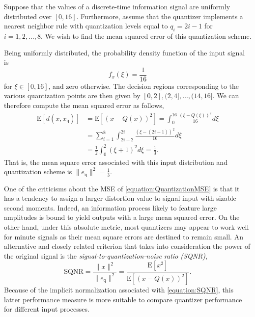 \begin{example} \label{example:UniformQuantizer}
Suppose that the values of a discrete-time information signal are uniformly distributed over $[0,16]$.
Furthermore, assume that the quantizer implements a nearest neighbor rule with quantization levels equal to $q_i = 2i - 1$ for $i = 1, 2, \ldots, 8$.
We wish to find the mean squared error of this quantization scheme.

Being uniformly distributed, the probability density function of the input signal is
\begin{equation*}
f_x (\xi) = \frac{1}{16}
\end{equation*}
for $\xi \in [0, 16]$, and zero otherwise.
The decision regions corresponding to the various quantization points are then given by $[0, 2], (2, 4], \ldots, (14, 16]$.
We can therefore compute the mean squared error as follows,
\begin{equation*}
\begin{split}
\mathrm{E} [ d(x, x_{\mathrm{q}}) ]
&= \mathrm{E} \left[ (x - Q(x))^2 \right]
= \int_0^{16} \frac{(\xi - Q(\xi))^2}{16} d\xi \\
&= \sum_{i=1}^8 \int_{2i-2}^{2i} \frac{(\xi - (2i - 1))^2}{16} d\xi \\
&= \frac{1}{2} \int_{0}^{2} (\xi + 1)^2 d\xi = \frac{1}{3} .
\end{split}
\end{equation*}
That is, the mean square error associated with this input distribution and quantization scheme is $\| e_{\mathrm{q}} \|^2 = \frac{1}{3}$.
\end{example}

One of the criticisms about the MSE of \eqref{equation:QuantizationMSE} is that it has a tendency to assign a larger distortion value to signal input with sizable second moments.
Indeed, an information process likely to feature large amplitudes is bound to yield outputs with a large mean squared error.
On the other hand, under this absolute metric, most quantizers may appear to work well for minute signals as their mean square errors are destined to remain small.
An alternative and closely related criterion that takes into consideration the power of the original signal is the \emph{signal-to-quantization-noise ratio (SQNR)},
\begin{equation} \label{equation:SQNR}
\text{SQNR} = \frac{\| x \|^2}{\| e_{\mathrm{q}} \|^2}
= \frac{\mathrm{E} \left[ x^2 \right]}{\mathrm{E} \left[ (x - Q(x))^2 \right]} .
\end{equation}
Because of the implicit normalization associated with \eqref{equation:SQNR}, this latter performance measure is more suitable to compare quantizer performance for different input processes.

